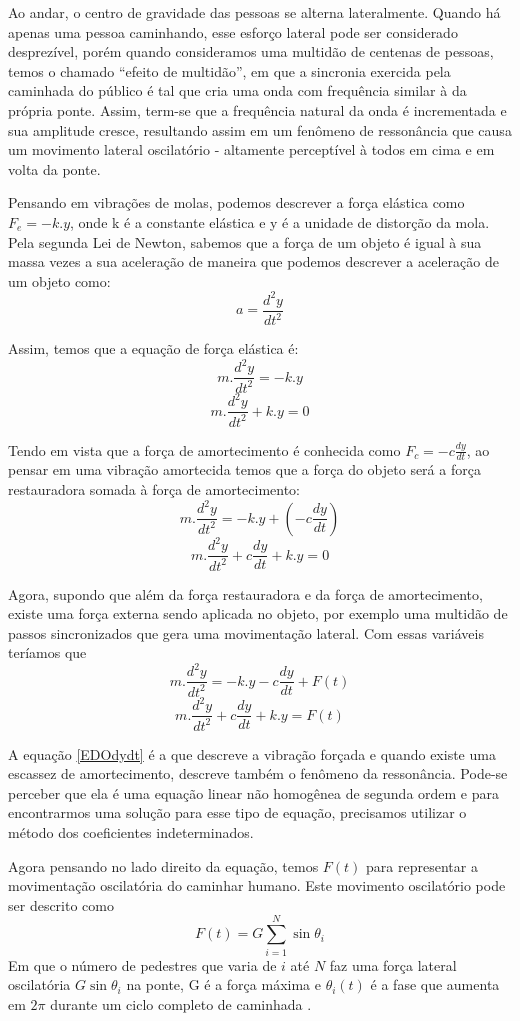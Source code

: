\documentclass[12pt]{article}
\begin{document}
Ao andar, o centro de gravidade das pessoas se alterna lateralmente. 
Quando há apenas uma pessoa caminhando, esse esforço lateral pode ser considerado 
desprezível, porém quando consideramos uma multidão de centenas de pessoas, temos o 
chamado “efeito de multidão”, em que a sincronia exercida pela caminhada do público é tal 
que cria uma onda com frequência similar à da própria ponte. Assim, 
term-se que a frequência natural da onda é incrementada e sua amplitude cresce, 
resultando assim em um fenômeno de ressonância que causa um movimento lateral 
oscilatório - altamente perceptível à todos em cima e em volta da ponte.

Pensando em vibrações de molas, podemos descrever a força elástica como $F_e = -k.y$, onde k é a
constante elástica e y é a unidade de distorção da mola. Pela segunda Lei de Newton, sabemos que a força de um
objeto é igual à sua massa vezes a sua aceleração de maneira que podemos descrever a aceleração de um objeto como:
\[ a = \frac{d^2 y}{d t^2} \]

Assim, temos que a equação de força elástica é:
\[ m.\frac{d^2 y}{d t^2} = -k.y \]
\[ m.\frac{d^2 y}{d t^2} + k.y = 0\]

Tendo em vista que a força de amortecimento é conhecida como $F_c = -c\frac{dy}{dt}$,
ao pensar em uma vibração amortecida temos que a força do objeto será a 
força restauradora somada à força de amortecimento:
\[ m.\frac{d^2 y}{d t^2} = -k.y + (- c\frac{dy}{dt})\]
\[ m.\frac{d^2 y}{d t^2} + c\frac{dy}{dt}  + k.y = 0\]

Agora, supondo que além da força restauradora e da força de amortecimento, existe uma força externa sendo aplicada no
objeto, por exemplo uma multidão de passos sincronizados que gera uma movimentação lateral.
Com essas variáveis teríamos que
\[ m.\frac{d^2 y}{d t^2} = -k.y - c\frac{dy}{dt} + F(t)\] 
\begin{equation}
    \label{EDOdydt}
    m.\frac{d^2 y}{d t^2} + c\frac{dy}{dt}  + k.y = F(t)
\end{equation}

A equação \ref{EDOdydt} é a que descreve a vibração forçada e quando existe uma escassez de amortecimento,
descreve também o fenômeno da ressonância.
Pode-se perceber que ela é uma equação linear não homogênea de segunda ordem e para encontrarmos 
uma solução para esse tipo de equação, precisamos utilizar o método dos coeficientes indeterminados.

Agora pensando no lado direito da equação, temos $F(t)$ para representar a movimentação
oscilatória do caminhar humano. Este movimento oscilatório pode ser descrito como 
\begin{equation}
    \label{Synch}
   F(t) = G\sum_{i = 1}^{N}  \sin \theta_i
\end{equation}
Em que o número de pedestres que varia de $i$ até $N$ faz uma força 
lateral oscilatória $G\sin\theta_i$ na ponte, G é a força máxima e $\theta_i(t)$
é a fase que aumenta em $2\pi$ durante um ciclo completo de 
caminhada \cite{crowdSynchrony05}. 
\end{document}
